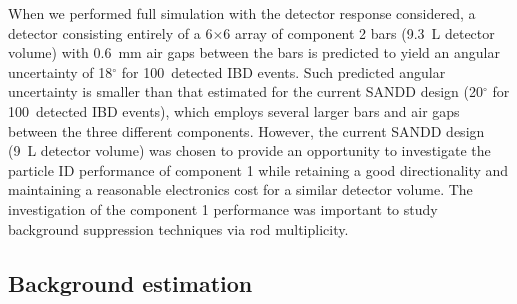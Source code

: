 \documentclass[final,5p,times,twocolumn]{elsarticle}
\begin{document}
When we performed full simulation with the detector response considered, a detector consisting entirely of a 6$\times$6 array of component 2 bars (9.3~L detector volume) with 0.6~mm air gaps between the bars is predicted to yield an angular uncertainty of 18$^\circ$ for 100~detected IBD events. 
Such predicted angular uncertainty is smaller than that estimated for the current SANDD design (20$^\circ$ for 100~detected IBD events), which employs several larger bars and air gaps between the three different components. 
However, the current SANDD design (9~L detector volume) was chosen to provide an opportunity to investigate the particle ID performance of component 1 while retaining a good directionality and maintaining a reasonable electronics cost for a similar detector volume. 
The investigation of the component 1 performance was important to study background suppression techniques via rod multiplicity. 

\subsection{Background estimation}
\end{document}
